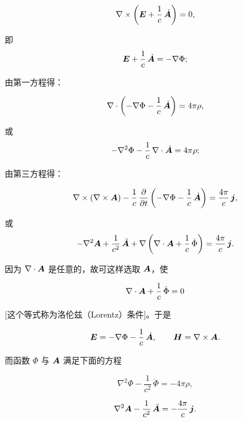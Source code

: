 \begin{equation*}
\nabla \times \left(\bm{E} + \frac{1}{c}\, \dot{\bm{A}}\right) = 0,
\end{equation*}

即
\begin{equation*}
\bm{E} + \frac{1}{c}\, \dot{\bm{A}} = -\nabla\Phi;
\end{equation*}

由第一方程得：

\begin{equation*}
\nabla \cdot \left(-\nabla\Phi - \frac{1}{c}\, \dot{\bm{A}}\right) = 4\pi\rho,
\end{equation*}

或
\begin{equation*}
-\nabla^{2}\Phi - \frac{1}{c}\, \nabla \cdot \dot{\bm{A}} = 4\pi\rho;
\end{equation*}

由第三方程得：

\begin{equation*}
\nabla \times (\nabla \times \bm{A}) - \frac{1}{c}\, \frac{\partial}{\partial t}\left(-\nabla\Phi - \frac{1}{c}\, \dot{\bm{A}}\right) = \frac{4\pi}{c}\, \bm{j},
\end{equation*}

或
\begin{equation*}
-\nabla^{2}\bm{A} + \frac{1}{c^{2}}\, \ddot{\bm{A}} + \nabla\left(\nabla \cdot \bm{A} + \frac{1}{c}\, \dot{\Phi}\right) = \frac{4\pi}{c}\, \bm{j}.
\end{equation*}

因为 $\nabla \cdot \bm{A}$ 是任意的，故可这样选取 $\bm{A}$，使

\begin{equation*}
\nabla \cdot \bm{A} + \frac{1}{c}\, \dot{\Phi} = 0
\end{equation*}

[这个等式称为洛伦兹（Lorentz）条件]。于是

\begin{equation*}
\bm{E} = -\nabla\Phi - \frac{1}{c}\, \dot{\bm{A}}, \qquad \bm{H} = \nabla \times \bm{A}.
\end{equation*}

而函数 $\Phi$ 与 $\bm{A}$ 满足下面的方程

\begin{equation}
\nabla^{2}\Phi - \frac{1}{c^{2}}\, \ddot{\Phi} = -4\pi\rho,
\tag{1.60}
\end{equation}

\begin{equation*}
\nabla^{2}\bm{A} - \frac{1}{c^{2}}\, \ddot{\bm{A}} = -\frac{4\pi}{c}\, \bm{j}.
\end{equation*}


